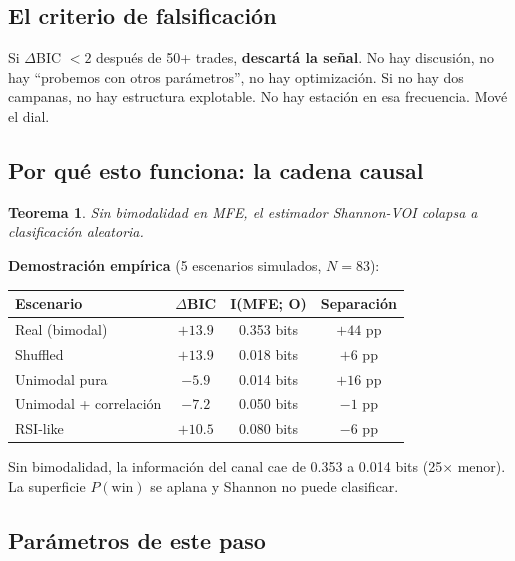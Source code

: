 \documentclass[11pt,a4paper]{article}
\newtheorem{theorem}{Teorema}[section]
\newcommand{\pw}{P(\text{win})}
\begin{document}
\subsection{El criterio de falsificaci\'on}

\begin{tcolorbox}[warning, title=Regla inquebrantable]
Si $\Delta$BIC $< 2$ despu\'es de 50+ trades, \textbf{descart\'a la
se\~nal}. No hay discusi\'on, no hay ``probemos con otros par\'ametros'',
no hay optimizaci\'on. Si no hay dos campanas, no hay estructura
explotable. No hay estaci\'on en esa frecuencia. Mov\'e el dial.
\end{tcolorbox}

\subsection{Por qu\'e esto funciona: la cadena causal}

\begin{tcolorbox}[math, title=Teorema: bimodalidad es condici\'on necesaria]
\begin{theorem}
Sin bimodalidad en MFE, el estimador Shannon-VOI colapsa a
clasificaci\'on aleatoria.
\end{theorem}

\textbf{Demostraci\'on emp\'irica} (5 escenarios simulados, $N=83$):

\medskip
\begin{tabular}{lccc}
\toprule
\textbf{Escenario} & $\Delta$\textbf{BIC} & \textbf{I(MFE; O)} & \textbf{Separaci\'on} \\
\midrule
Real (bimodal) & $+13.9$ & 0.353 bits & $+44$ pp \\
Shuffled & $+13.9$ & 0.018 bits & $+6$ pp \\
Unimodal pura & $-5.9$ & 0.014 bits & $+16$ pp \\
Unimodal + correlaci\'on & $-7.2$ & 0.050 bits & $-1$ pp \\
RSI-like & $+10.5$ & 0.080 bits & $-6$ pp \\
\bottomrule
\end{tabular}

\medskip
Sin bimodalidad, la informaci\'on del canal cae de 0.353 a 0.014
bits (25$\times$ menor). La superficie $\pw$ se aplana y Shannon no
puede clasificar.
\end{tcolorbox}

\subsection{Par\'ametros de este paso}
\end{document}
